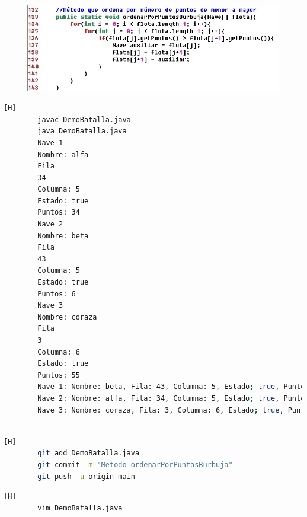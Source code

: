 \documentclass{article}
\begin{document}
	\begin{figure}[H]
		\centering
		\includegraphics[width=1\textwidth,keepaspectratio]{img/3.jpg}
	\end{figure}

	
	\begin{lstlisting}[language=bash,caption={Probando el metodo ordenarPorPuntosBurbuja}][H]	
		javac DemoBatalla.java
		java DemoBatalla.java
		Nave 1
		Nombre: alfa
		Fila
		34
		Columna: 5
		Estado: true
		Puntos: 34
		Nave 2
		Nombre: beta
		Fila
		43
		Columna: 5
		Estado: true
		Puntos: 6
		Nave 3
		Nombre: coraza
		Fila
		3
		Columna: 6
		Estado: true
		Puntos: 55
		Nave 1: Nombre: beta, Fila: 43, Columna: 5, Estado; true, Puntos: 6
		Nave 2: Nombre: alfa, Fila: 34, Columna: 5, Estado; true, Puntos: 34
		Nave 3: Nombre: coraza, Fila: 3, Columna: 6, Estado; true, Puntos: 55
		
	\end{lstlisting}
	\begin{lstlisting}[language=bash,caption={Commit: Metodo ordenarPorPuntosBurbuja fue culminado }][H]
		git add DemoBatalla.java
		git commit -m "Metodo ordenarPorPuntosBurbuja"			
		git push -u origin main
	\end{lstlisting}
	
	
	
	
	
	
	
	
	
	
	
	
	
	
	
	
	
	
	
	
	
	
	
	
	
	
	
	
	
	
	
	
	
	
	\begin{lstlisting}[language=bash,caption={Implementado el método ordenarPorNombreBurbuja}][H]
		vim DemoBatalla.java
	\end{lstlisting}
	
\end{document}
